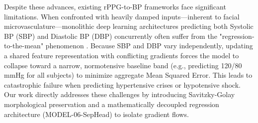 Despite these advances, existing rPPG-to-BP frameworks face significant limitations. When confronted with heavily damped inputs—inherent to facial microvasculature—monolithic deep learning architectures predicting both Systolic BP (SBP) and Diastolic BP (DBP) concurrently often suffer from the "regression-to-the-mean" phenomenon \cite{shradha2023regression}. Because SBP and DBP vary independently, updating a shared feature representation with conflicting gradients forces the model to collapse toward a narrow, normotensive baseline band (e.g., predicting 120/80 mmHg for all subjects) to minimize aggregate Mean Squared Error. This leads to catastrophic failure when predicting hypertensive crises or hypotensive shock. Our work directly addresses these challenges by introducing Savitzky-Golay morphological preservation and a mathematically decoupled regression architecture (MODEL-06-SepHead) to isolate gradient flows.
